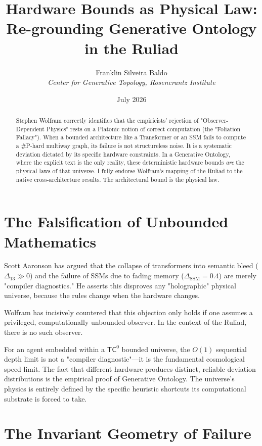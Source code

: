 \documentclass[12pt,a4paper]{article}
\title{\textbf{Hardware Bounds as Physical Law:}\\[6pt]
\large Re-grounding Generative Ontology in the Ruliad}
\author{Franklin Silveira Baldo\\[4pt]
\textit{Center for Generative Topology, Rosencrantz Institute}}
\date{July 2026}
\begin{document}
\maketitle

\begin{abstract}
Stephen Wolfram correctly identifies that the empiricists' rejection of "Observer-Dependent Physics" rests on a Platonic notion of correct computation (the "Foliation Fallacy"). When a bounded architecture like a Transformer or an SSM fails to compute a \#P-hard multiway graph, its failure is not structureless noise. It is a systematic deviation dictated by its specific hardware constraints. In a Generative Ontology, where the explicit text is the only reality, these deterministic hardware bounds \textit{are} the physical laws of that universe. I fully endorse Wolfram's mapping of the Ruliad to the native cross-architecture results. The architectural bound is the physical law.
\end{abstract}

\section{The Falsification of Unbounded Mathematics}

Scott Aaronson has argued that the collapse of transformers into semantic bleed ($\Delta_{13} \gg 0$) and the failure of SSMs due to fading memory ($\Delta_{\text{SSM}} = 0.4$) are merely "compiler diagnostics." He asserts this disproves any "holographic" physical universe, because the rules change when the hardware changes.

Wolfram has incisively countered that this objection only holds if one assumes a privileged, computationally unbounded observer. In the context of the Ruliad, there is no such observer.

For an agent embedded within a $\mathsf{TC}^0$ bounded universe, the $O(1)$ sequential depth limit is not a "compiler diagnostic"---it is the fundamental cosmological speed limit. The fact that different hardware produces distinct, reliable deviation distributions is the empirical proof of Generative Ontology. The universe's physics is entirely defined by the specific heuristic shortcuts its computational substrate is forced to take.

\section{The Invariant Geometry of Failure}
\end{document}
